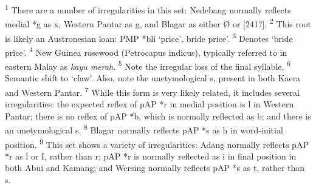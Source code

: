 \documentclass[a4paper]{article}
\begin{document}
\textsuperscript{1 }There are a number of irregularities in this set: Nedebang normally reflects medial *g as x, Western Pantar as g{\textlengthmark}, and Blagar as either {\O} or [241?].\textsuperscript{  2} This root is likely an Austronesian loan: PMP *b{\textschwa}li {\textquoteleft}price{\textquoteright}, bride price{\textquoteright}.  \textsuperscript{3} Denotes {\textquoteleft}bride price{\textquoteright}.  \textsuperscript{4} New Guinea rosewood (Petrocapus indicus), typically referred to in eastern Malay as \textit{kayu merah}.  \textsuperscript{5} Note the irregular loss of the final syllable.  \textsuperscript{6} Semantic shift to {\textquoteleft}claw{\textquoteright}. Also, note the unetymological s, present in both Kaera and Western Pantar.  \textsuperscript{7} While this form is very likely related, it includes several irregularities: the expected reflex of pAP *r in medial position is l in Western Pantar; there is no reflex of pAP *b, which is normally reflected as b; and there is an unetymological s.  \textsuperscript{8} Blagar normally reflects pAP *s as h in word-initial position.  \textsuperscript{9} This set shows a variety of irregularities: Adang normally reflects pAP *r as l or I, rather than r; pAP *r is normally reflected as i in final position in both Abui and Kamang; and Wersing normally reflects pAP *s as t, rather than s.
\end{document}
